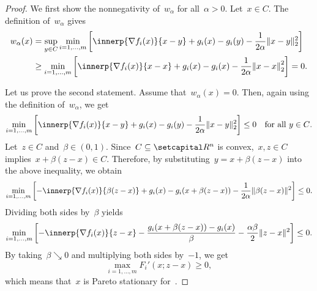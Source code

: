 \documentclass[../../main]{subfiles}
\begin{document}
\begin{proof}
    We first show the nonnegativity of~$w_\alpha$ for all~$\alpha > 0$.
    Let~$x \in C$.
    The definition of~$w_\alpha$ gives
    \begin{align}
        w_\alpha(x)
         & = \sup_{y \in C} \min_{i = 1, \dots, m} \left[ \innerp{\nabla f_i(x)}{x - y} + g_i(x) - g_i(y) - \frac{1}{2 \alpha} \norm{x - y}_2^2 \right] \\
         & \ge \min_{i = 1, \dots, m} \left[ \innerp{\nabla f_i(x)}{x - x} + g_i(x) - g_i(x) - \frac{1}{2 \alpha} \norm*{x - x}_2^2 \right] = 0
        .\end{align}

    Let us prove the second statement.
    Assume that~$w_\alpha(x) = 0$.
    Then, again using the definition of~$w_\alpha$, we get
    \begin{equation}
        \min_{i = 1, \dots, m} \left[ \innerp{\nabla f_i(x)}{x - y} + g_i(x) - g_i(y) - \frac{1}{2 \alpha} \norm{x - y}_2^2 \right] \le 0 \forallcondition{y \in C}
        .\end{equation}
    Let~$z \in C$ and~$\beta \in (0, 1)$.
    Since~$C \subseteq \setR^n$ is convex,~$x, z \in C$ implies~$x + \beta (z - x) \in C$.
    Therefore, by substituting~$y = x + \beta (z - x)$ into the above inequality, we obtain
    \begin{equation}
        \min_{i = 1, \dots, m} \left[ - \innerp{\nabla f_i(x)}{\beta (z - x)} + g_i(x) - g_i(x + \beta (z - x)) - \frac{1}{2 \alpha} \norm{\beta (z - x)}^2 \right] \le 0
        .\end{equation}
    Dividing both sides by~$\beta$ yields
    \begin{equation}
        \min_{i = 1, \dots, m} \left[ - \innerp{\nabla f_i(x)}{z - x} - \frac{g_i(x + \beta (z - x)) - g_i(x)}{\beta} - \frac{\alpha \beta}{2} \norm{z - x}^2 \right] \le 0
        .\end{equation}
    By taking~$\beta \searrow 0$ and multiplying both sides by~$- 1$, we get
    \begin{equation}
        \max_{i = 1, \dots, m} F_i'(x; z - x) \ge 0
        ,\end{equation}
    which means that~$x$ is Pareto stationary for~.


\end{proof}
\end{document}

